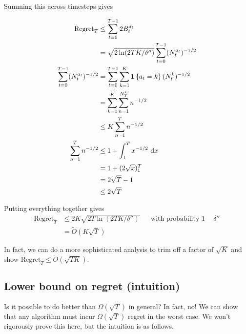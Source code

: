 \documentclass[\main/main]{subfiles}
\begin{document}
Summing this across timesteps gives

\begin{align*}
    \text{Regret}_T                     & \le \sum_{t=0}^{T-1} 2 B^{a_t}_t                                \\
                                        & = \sqrt{2\ln(2TK/\delta'')} \sum_{t=0}^{T-1} (N^{a_t}_t)^{-1/2} \\
    \sum_{t=0}^{T-1} (N^{a_t}_t)^{-1/2} & = \sum_{t=0}^{T-1} \sum_{k=1}^K \mathbf{1}\left\{ a_t = k \right\} (N^k_t)^{-1/2}  \\
                                        & = \sum_{k=1}^K \sum_{n=1}^{N_T^k} n^{-1/2}                      \\
                                        & \le K \sum_{n=1}^T n^{-1/2}                                     \\
    \sum_{n=1}^T n^{-1/2}               & \le 1 + \int_1^T x^{-1/2} \ \mathrm{d}x                         \\
                                        & = 1 + (2 \sqrt{x})_1^T                                          \\
                                        & = 2 \sqrt{T} - 1                                                \\
                                        & \le 2 \sqrt{T}                                                  \\
\end{align*}

Putting everything together gives
\begin{align*}
    \text{Regret}_T & \le 2 K \sqrt{2T \ln(2TK/\delta'')} &  & \text{with probability } 1-\delta'' \\
                    & = \tilde O(K\sqrt{T})
\end{align*}


In fact, we can do a more sophisticated analysis to trim off a factor of $\sqrt{K}$ and show $\text{Regret}_T \le \tilde O(\sqrt{TK})$.

\subsection{Lower bound on regret (intuition)}

Is it possible to do better than $\Omega(\sqrt{T})$ in general? In fact, no! We can show that any algorithm must incur $\Omega(\sqrt{T})$ regret in the worst case. We won't rigorously prove this here, but the intuition is as follows.
\end{document}
